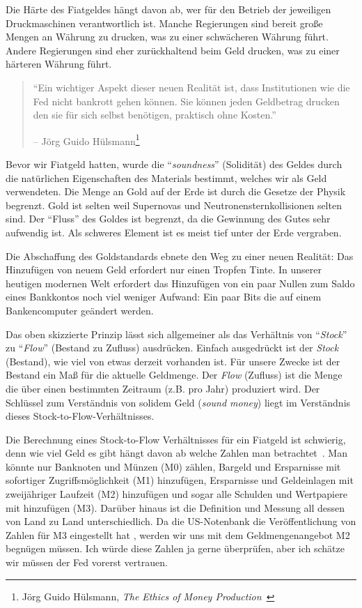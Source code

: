 Die Härte des Fiatgeldes hängt davon ab, wer für den Betrieb der jeweiligen
Druckmaschinen verantwortlich ist. Manche Regierungen sind bereit große Mengen
an Währung zu drucken, was zu einer schwächeren Währung führt. Andere
Regierungen sind eher zurückhaltend beim Geld drucken, was zu einer härteren
Währung führt.

\begin{samepage}\begin{quotation}
\enquote{Ein wichtiger Aspekt dieser neuen Realität ist, dass Institutionen wie
die Fed nicht bankrott gehen können. Sie können jeden Geldbetrag drucken den sie
für sich selbst benötigen, praktisch ohne Kosten.}
\begin{flushright} -- Jörg Guido Hülsmann\footnote{Jörg Guido Hülsmann, \textit{The
Ethics of Money Production}~\cite{hulsmann2008ethics}}
\end{flushright}\end{quotation}\end{samepage}

Bevor wir Fiatgeld hatten, wurde die \enquote{\textit{soundness}} (Solidität)
des Geldes durch die natürlichen Eigenschaften des Materials bestimmt, welches
wir als Geld verwendeten. Die Menge an Gold auf der Erde ist durch die Gesetze
der Physik begrenzt. Gold ist selten weil Supernovas und
Neutronensternkollisionen selten sind. Der \enquote{Fluss} des Goldes ist
begrenzt, da die Gewinnung des Gutes sehr aufwendig ist. Als schweres Element
ist es meist tief unter der Erde vergraben.

Die Abschaffung des Goldstandards ebnete den Weg zu einer neuen Realität: Das
Hinzufügen von neuem Geld erfordert nur einen Tropfen Tinte. In unserer heutigen
modernen Welt erfordert das Hinzufügen von ein paar Nullen zum Saldo eines
Bankkontos noch viel weniger Aufwand: Ein paar Bits die auf einem Bankencomputer
geändert werden.

Das oben skizzierte Prinzip lässt sich allgemeiner als das Verhältnis von
\enquote{\textit{Stock}} zu \enquote{\textit{Flow}} (Bestand zu Zufluss)
ausdrücken. Einfach ausgedrückt ist der \textit{Stock} (Bestand), wie viel von
etwas derzeit vorhanden ist. Für unsere Zwecke ist der Bestand ein Maß für die
aktuelle Geldmenge. Der \textit{Flow} (Zufluss) ist die Menge die über einen
bestimmten Zeitraum (z.B. pro Jahr) produziert wird. Der Schlüssel zum
Verständnis von solidem Geld (\textit{sound money}) liegt im Verständnis dieses
Stock-to-Flow-Verhältnisses.

Die Berechnung eines Stock-to-Flow Verhältnisses für ein Fiatgeld ist schwierig,
denn wie viel Geld es gibt hängt davon ab welche Zahlen man
betrachtet~\cite{wiki:money-supply}. Man könnte nur Banknoten und Münzen (M0)
zählen, Bargeld und Ersparnisse mit sofortiger Zugriffsmöglichkeit (M1)
hinzufügen, Ersparnisse und Geldeinlagen mit zweijähriger Laufzeit (M2) hinzufügen
und sogar alle Schulden und Wertpapiere mit hinzufügen (M3). Darüber hinaus ist
die Definition und Messung all dessen von Land zu Land unterschiedlich. Da die
US-Notenbank die Veröffentlichung von Zahlen für M3 eingestellt hat
\cite{web:fed-m3}, werden wir uns mit dem Geldmengenangebot M2 begnügen müssen.
Ich würde diese Zahlen ja gerne überprüfen, aber ich schätze wir müssen der
Fed vorerst vertrauen.

